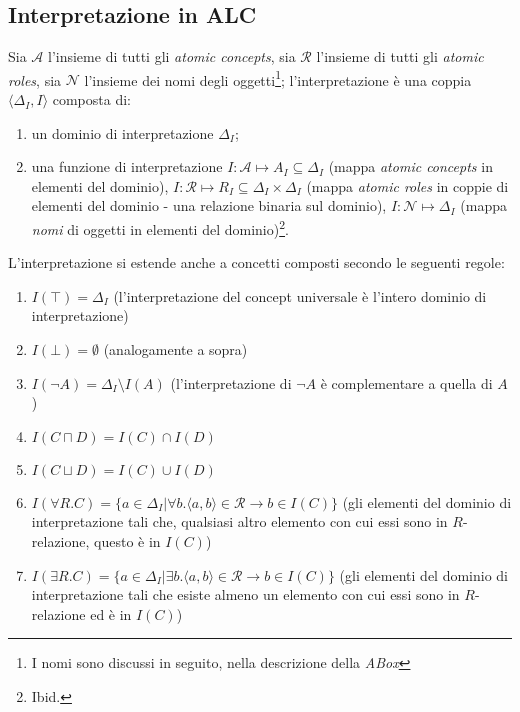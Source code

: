 \subsection{Interpretazione in ALC}
Sia $\mathcal{A}$ l'insieme di tutti gli \textit{atomic concepts}, sia $\mathcal{R}$ l'insieme di tutti gli \textit{atomic roles}, sia $\mathcal{N}$ l'insieme dei nomi degli oggetti\footnote{I nomi sono discussi in seguito, nella descrizione della \textit{ABox}}; l'interpretazione è una coppia $\langle \Delta_I, I \rangle$ composta di:
\begin{enumerate}
\item un dominio di interpretazione $\Delta_I$;
\item una funzione di interpretazione $I: \mathcal{A} \mapsto A_I \subseteq \Delta_I$ (mappa \textit{atomic concepts} in elementi del dominio), $I: \mathcal{R} \mapsto R_I \subseteq \Delta_I \times \Delta_I$ (mappa \textit{atomic roles} in coppie di elementi del dominio - una relazione binaria sul dominio), $I: \mathcal{N} \mapsto \Delta_I$ (mappa \textit{nomi} di oggetti in elementi del dominio)\footnote{Ibid.}.
\end{enumerate}

L'interpretazione si estende anche a concetti composti secondo le seguenti regole:
\begin{enumerate}
\item $I(\top) = \Delta_I$ (l'interpretazione del concept universale è l'intero dominio di interpretazione)
\item $I(\bot) = \emptyset$ (analogamente a sopra)
\item $I(\lnot A) = \Delta_I \setminus I(A)$ (l'interpretazione di $\lnot A$ è complementare a quella di $A$)
\item $I(C \sqcap D) = I(C) \cap I(D)$
\item $I(C \sqcup D) = I(C) \cup I(D)$
\item $I(\forall R. C) = \lbrace a \in \Delta_I | \forall b. \langle a, b \rangle \in \mathcal{R} \to b \in I(C) \rbrace$ (gli elementi del dominio di interpretazione tali che, qualsiasi altro elemento con cui essi sono in $R$-relazione, questo è in $I(C)$)
\item $I(\exists R. C) = \lbrace a \in \Delta_I | \exists b. \langle a, b \rangle \in \mathcal{R} \to b \in I(C) \rbrace$ (gli elementi del dominio di interpretazione tali che esiste almeno un elemento con cui essi sono in $R$-relazione ed è in $I(C)$)
\end{enumerate}

